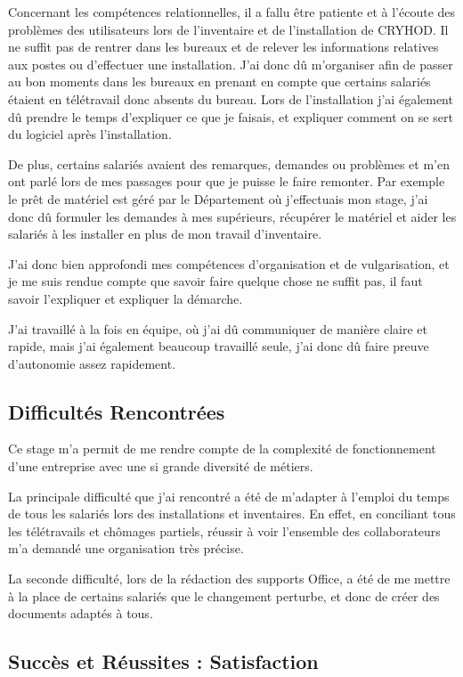 Concernant les compétences relationnelles, il a fallu être patiente et à l'écoute des problèmes des utilisateurs lors de l'inventaire et de l'installation de CRYHOD. 
Il ne suffit pas de rentrer dans les bureaux et de relever les informations relatives aux postes ou d'effectuer une installation. J'ai donc dû m'organiser afin de passer au bon moments dans les bureaux en prenant en compte que certains salariés étaient en télétravail donc absents du bureau.
Lors de l'installation j'ai également dû prendre le temps d'expliquer ce que je faisais, et expliquer comment on se sert du logiciel après l'installation.

De plus, certains salariés avaient des remarques, demandes ou problèmes et m'en ont parlé lors de mes passages pour que je puisse le faire remonter.
Par exemple le prêt de matériel est géré par le Département où j'effectuais mon stage, j'ai donc dû formuler les demandes à mes supérieurs, récupérer le matériel et aider les salariés à les installer en plus de mon travail d'inventaire.

J'ai donc bien approfondi mes compétences d'organisation et de vulgarisation, et je me suis rendue compte que savoir faire quelque chose ne suffit pas, il faut savoir l'expliquer et expliquer la démarche.

J'ai travaillé à la fois en équipe, où j'ai dû communiquer de manière claire et rapide, mais j'ai également beaucoup travaillé seule, j'ai donc dû faire preuve d'autonomie assez rapidement.



\subsection{Difficultés Rencontrées}

Ce stage m'a permit de me rendre compte de la complexité de fonctionnement d'une entreprise avec une si grande diversité de métiers.

La principale difficulté que j'ai rencontré a été de m'adapter à l'emploi du temps de tous les salariés lors des installations et inventaires.
En effet, en conciliant tous les télétravails et chômages partiels, réussir à voir l'ensemble des collaborateurs m'a demandé une organisation très précise.

La seconde difficulté, lors de la rédaction des supports Office, a été de me mettre à la place de certains salariés que le changement perturbe, et donc de créer des documents adaptés à tous.


\subsection{Succès et Réussites : Satisfaction}

